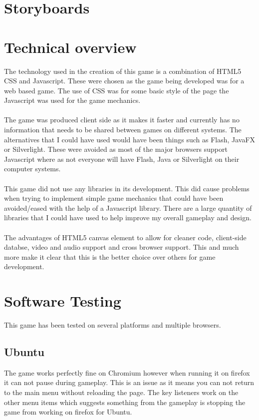 \documentclass{article}
\begin{document}
\section{Storyboards}



\section{Technical overview}
The technology used in the creation of this game is a combination of HTML5 CSS and Javascript. These were chosen as the game being developed was for a web based game. The use of CSS was for some basic style of the page the Javascript was used for the game mechanics.
\\\\
The game was produced client side as it makes it faster and currently has no information that needs to be shared between games on different systems. The alternatives that I could have used would have been things such as Flash, JavaFX or Silverlight. These were avoided as most of the major browsers support Javascript where as not everyone will have Flash, Java or Silverlight on their computer systems.
\\\\
This game did not use any libraries in its development. This did cause problems when trying to implement simple game mechanics that could have been avoided/eased with the help of a Javascript library. There are a large quantity of libraries that I could have used to help improve my overall gameplay and design. 
\\\\
The advantages of HTML5 canvas element to allow for cleaner code, client-side databse, video and audio support and cross browser support. This and much more make it clear that this is the better choice over others for game development.


\section{Software Testing}
This game has been tested on several platforms and multiple browsers.
\subsection{Ubuntu}
The game works perfectly fine on Chromium however when running it on firefox it can not pause during gameplay. This is an issue as it means you can not return to the main menu without reloading the page. The key listeners work on the other menu items which suggests something from the gameplay is stopping the game from working on firefox for Ubuntu.
\end{document}
